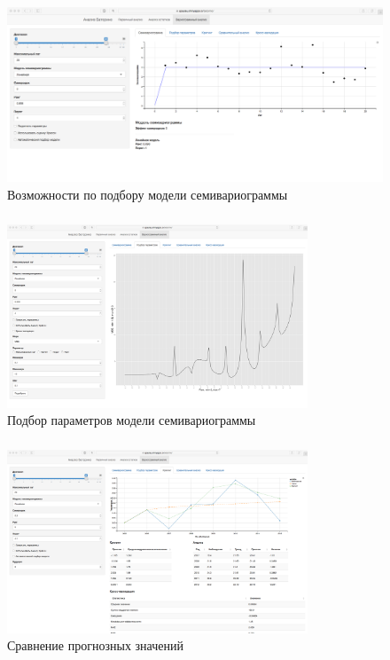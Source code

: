 \documentclass[10pt,pdf,aspectratio=169,hyperref={unicode},notheorems]{beamer}
\theoremstyle{definition}
\theoremstyle{example}
\theoremstyle{plain}
\begin{document}
\begin{frame}
  \frametitle{\large\secname}
  \framesubtitle{\subsecname}
    \begin{figure}[h]
    \includegraphics[width=1\textwidth]{../../figures/static/4_variogram.png}
    \caption{Возможности по подбору модели семивариограммы}
  \end{figure}
\end{frame}

\begin{frame}
  \frametitle{\large\secname}
  \framesubtitle{\subsecname}
    \begin{figure}[h]
    \includegraphics[width=0.8\textwidth]{../../figures/static/5_fit.png}
    \caption{Подбор параметров модели семивариограммы}
  \end{figure}
\end{frame}

\begin{frame}
  \frametitle{\large\secname}
  \framesubtitle{\subsecname}
    \begin{figure}[h]
    \includegraphics[width=0.8\textwidth]{../../figures/static/6_krige.png}
    \caption{Сравнение прогнозных значений}
  \end{figure}
\end{frame}
\end{document}
